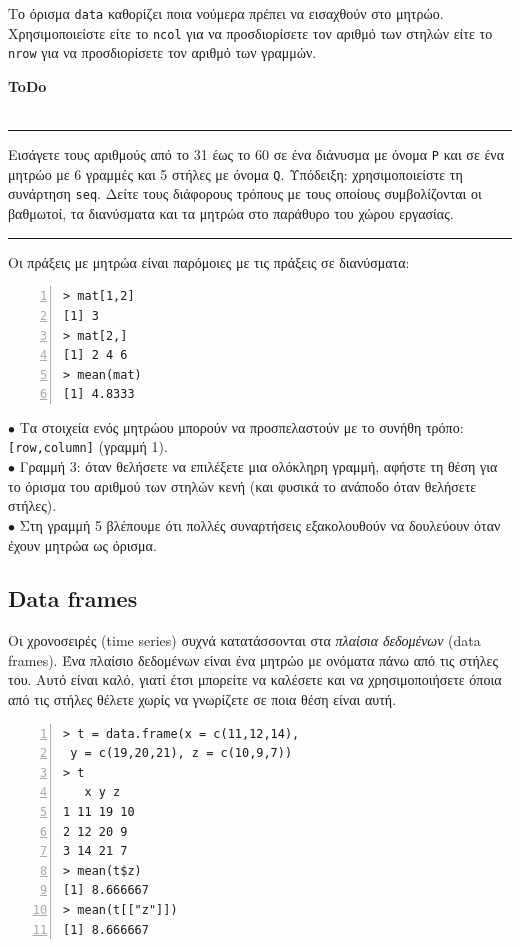 \documentclass[a4paper,11pt,twocolumn,tablecaptionabove]{scrartcl}
\newenvironment{ToDo} {%
  \begin{flushright}
    \hfill
    \begin{minipage}{0.95\columnwidth}         %
    \textsf{\textbf{ToDo}} \\
      \vspace{-0.85cm}\\
      {\color{Gray}\rule[-0.1cm]{\columnwidth}{1.5pt}}} { %
      {\color{Gray} \rule[0.3cm]{\columnwidth}{1.5pt}}
    \end{minipage}
    \vspace{1em}
  \end{flushright}
  }
\begin{document}
Το όρισμα \texttt{data} καθορίζει ποια νούμερα πρέπει να εισαχθούν στο μητρώο. Χρησιμοποιείστε είτε το 
\texttt{ncol} για να προσδιορίσετε τον αριθμό των στηλών είτε το \texttt{nrow} για να προσδιορίσετε τον
αριθμό των γραμμών. 

\begin{ToDo}
Εισάγετε τους αριθμούς από το 31 έως το 60 σε ένα διάνυσμα με όνομα \texttt{P} και σε ένα μητρώο με 6 γραμμές
και 5 στήλες με όνομα \texttt{Q}. Υπόδειξη: χρησιμοποιείστε τη συνάρτηση \texttt{seq}. Δείτε τους διάφορους
τρόπους με τους οποίους συμβολίζονται οι βαθμωτοί, τα διανύσματα και τα μητρώα στο παράθυρο του χώρου 
εργασίας.\\
\end{ToDo}
 
Οι πράξεις με μητρώα είναι παρόμοιες με τις πράξεις σε διανύσματα:

\begin{Verbatim}[frame=single,numbers=left,gobble=0, xleftmargin=0.35cm, numbersep=0.1cm]
> mat[1,2]
[1] 3
> mat[2,]
[1] 2 4 6
> mean(mat)
[1] 4.8333
\end{Verbatim}

\noindent $\bullet$ Τα στοιχεία ενός μητρώου μπορούν να προσπελαστούν με το συνήθη τρόπο: \texttt{[row,column]}
(γραμμή 1). \\
\noindent $\bullet$ Γραμμή 3: όταν θελήσετε να επιλέξετε μια ολόκληρη γραμμή, αφήστε τη θέση για το όρισμα του
αριθμού των στηλών κενή (και φυσικά το ανάποδο όταν θελήσετε στήλες).\\
\noindent $\bullet$ Στη γραμμή 5 βλέπουμε ότι πολλές συναρτήσεις εξακολουθούν να δουλεύουν όταν έχουν μητρώα
ως όρισμα.\\

\subsection{Data frames}

Οι χρονοσειρές (time series) συχνά κατατάσσονται στα \emph{πλαίσια δεδομένων} (data frames). Ένα πλαίσιο
δεδομένων είναι ένα μητρώο με ονόματα πάνω από τις στήλες του. Αυτό είναι καλό, γιατί έτσι μπορείτε να καλέσετε
και να χρησιμοποιήσετε όποια από τις στήλες θέλετε χωρίς να γνωρίζετε σε ποια θέση είναι αυτή.
\begin{Verbatim}[frame=single,numbers=left,gobble=0, xleftmargin=0.35cm, numbersep=0.1cm]
> t = data.frame(x = c(11,12,14),
 y = c(19,20,21), z = c(10,9,7))
> t
   x y z
1 11 19 10
2 12 20 9 
3 14 21 7  
> mean(t$z)
[1] 8.666667
> mean(t[["z"]])
[1] 8.666667
\end{Verbatim}
\end{document}
